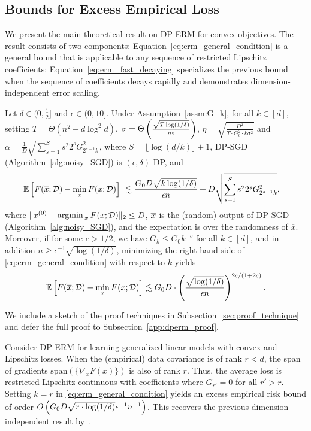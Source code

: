 \subsection{Bounds for Excess Empirical Loss}
We present the main theoretical result on DP-ERM for convex objectives. 
The result consists of two components:
Equation~\eqref{eq:erm_general_condition} is a general bound that is applicable to any sequence of restricted Lipschitz coefficients;
Equation~\eqref{eq:erm_fast_decaying} specializes the previous bound when the sequence of coefficients decays rapidly and demonstrates dimension-independent error scaling.
\begin{theo}
\label{thm:DPERM}
Let $ \delta \in (0, \frac{1}{2}]$ and $\epsilon\in(0,10]$.
Under Assumption~\ref{assm:G_k}, for all $k \in [d]$, 
setting 
$T=\Theta(n^2 + d \log^2 d)$, $\sigma=\Theta \left( \frac{\sqrt{T\log(1/\delta)}}{n\epsilon} \right)$, $\eta=\sqrt{\frac{D^{2}}{T\cdot G_{0}^{2}\cdot k\sigma^{2}}}$
and $\alpha=\frac{1}{D}\sqrt{\sum_{s=1}^S s^2 2^{s}G_{2^{s-1}k}^{2}}$, where $S = \lfloor \log (d / k) \rfloor + 1$, DP-SGD (Algorithm~\ref{alg:noisy_SGD}) is $(\epsilon,\delta)$-DP, and
\begin{align}
\label{eq:erm_general_condition}
\mathbb{E} \left[  F(\overline{x};\mathcal D)-  \min_x F(x;\mathcal D) \right] &~ \lesssim \frac{G_{0}D\sqrt{k\log(1/\delta)}}{\epsilon n}+D\sqrt{\sum_{s=1}^{S}s^2 2^{s}G_{2^{s-1}k}^{2}},
\end{align}
where $\|x^{(0)}- \mathop{\mathrm{argmin\,}}_x F(x; \mathcal D) \|_2 \le D$, $\overline{x}$ is the (random) output of DP-SGD (Algorithm~\ref{alg:noisy_SGD}), and the expectation is over the randomness of $\overline{x}$.
Moreover, if for some $c>1/2$, we have $G_k\leq G_0 k^{-c}$ for all $k \in [d]$, and in addition $ n\geq \epsilon^{-1} \sqrt{\log(1/\delta)}$,
minimizing the right hand side of \eqref{eq:erm_general_condition} with respect to $k$ yields
\begin{align}
\label{eq:erm_fast_decaying}
\mathbb{E} \left[  F(\overline{x};\mathcal D)-  \min_x F(x;\mathcal D) \right] \lesssim G_{0}D \cdot \left( 
        \frac{\sqrt{\log(1/\delta)}}{\epsilon n}
    \right)^{2c/(1+2c)
}.
\end{align}
\end{theo}
We include a sketch of the proof techniques in Subsection~\ref{sec:proof_technique} and defer the full proof to Subsection~\ref{app:dperm_proof}.
\begin{Remark}
Consider DP-ERM for learning generalized linear models with convex and Lipschitz losses.
When the (empirical) data covariance is of rank $r < d$, the span of gradients $\text{span}(\{ \nabla_x F(x) \})$ is also of rank $r$. 
Thus, the average loss is restricted Lipschitz continuous with coefficients where $G_{r'} = 0$ for all $r' > r$. 
Setting $k = r$ in \eqref{eq:erm_general_condition} yields an excess empirical risk bound of order $O\left( {G_{0}D\sqrt{ r \cdot\log(1/\delta)}} \epsilon^{-1} n^{-1} \right)$.
This recovers the previous dimension-independent result by~\cite{song2021evading}.
\end{Remark}


